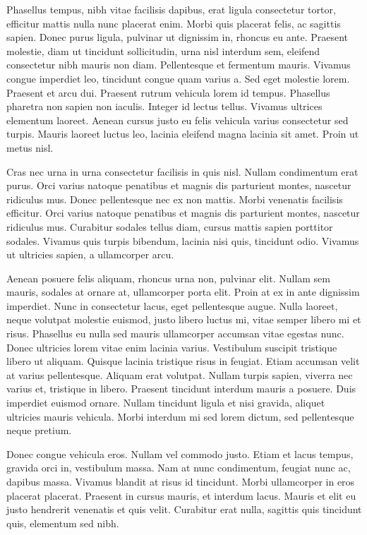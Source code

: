 \documentclass{article}
\begin{document}
Phasellus tempus, nibh vitae facilisis dapibus, erat ligula consectetur tortor, efficitur mattis nulla nunc placerat enim. Morbi quis placerat felis, ac sagittis sapien. Donec purus ligula, pulvinar ut dignissim in, rhoncus eu ante. Praesent molestie, diam ut tincidunt sollicitudin, urna nisl interdum sem, eleifend consectetur nibh mauris non diam. Pellentesque et fermentum mauris. Vivamus congue imperdiet leo, tincidunt congue quam varius a. Sed eget molestie lorem. Praesent et arcu dui. Praesent rutrum vehicula lorem id tempus. Phasellus pharetra non sapien non iaculis. Integer id lectus tellus. Vivamus ultrices elementum laoreet. Aenean cursus justo eu felis vehicula varius consectetur sed turpis. Mauris laoreet luctus leo, lacinia eleifend magna lacinia sit amet. Proin ut metus nisl.

Cras nec urna in urna consectetur facilisis in quis nisl. Nullam condimentum erat purus. Orci varius natoque penatibus et magnis dis parturient montes, nascetur ridiculus mus. Donec pellentesque nec ex non mattis. Morbi venenatis facilisis efficitur. Orci varius natoque penatibus et magnis dis parturient montes, nascetur ridiculus mus. Curabitur sodales tellus diam, cursus mattis sapien porttitor sodales. Vivamus quis turpis bibendum, lacinia nisi quis, tincidunt odio. Vivamus ut ultricies sapien, a ullamcorper arcu.

Aenean posuere felis aliquam, rhoncus urna non, pulvinar elit. Nullam sem mauris, sodales at ornare at, ullamcorper porta elit. Proin at ex in ante dignissim imperdiet. Nunc in consectetur lacus, eget pellentesque augue. Nulla laoreet, neque volutpat molestie euismod, justo libero luctus mi, vitae semper libero mi et risus. Phasellus eu nulla sed mauris ullamcorper accumsan vitae egestas nunc. Donec ultricies lorem vitae enim lacinia varius. Vestibulum suscipit tristique libero ut aliquam. Quisque lacinia tristique risus in feugiat. Etiam accumsan velit at varius pellentesque. Aliquam erat volutpat. Nullam turpis sapien, viverra nec varius et, tristique in libero. Praesent tincidunt interdum mauris a posuere. Duis imperdiet euismod ornare. Nullam tincidunt ligula et nisi gravida, aliquet ultricies mauris vehicula. Morbi interdum mi sed lorem dictum, sed pellentesque neque pretium.

Donec congue vehicula eros. Nullam vel commodo justo. Etiam et lacus tempus, gravida orci in, vestibulum massa. Nam at nunc condimentum, feugiat nunc ac, dapibus massa. Vivamus blandit at risus id tincidunt. Morbi ullamcorper in eros placerat placerat. Praesent in cursus mauris, et interdum lacus. Mauris et elit eu justo hendrerit venenatis et quis velit. Curabitur erat nulla, sagittis quis tincidunt quis, elementum sed nibh.
\end{document}
